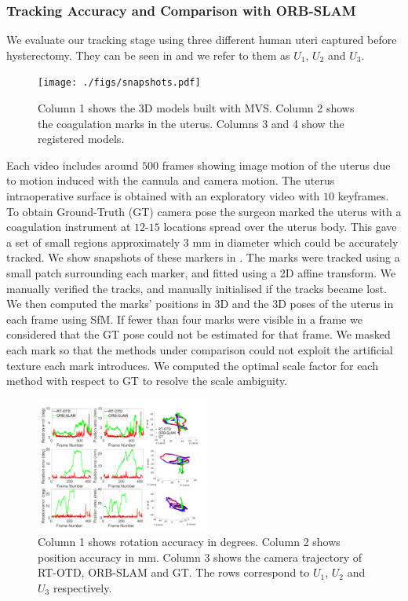 \subsubsection{Tracking Accuracy and Comparison with ORB-SLAM}
We evaluate our tracking stage using three different human uteri captured before hysterectomy. They can be seen in  and we refer to them as $U_1$, $U_2$ and $U_3$.
\begin{figure}[htbp]
  \centering
  \texttt{[image: ./figs/snapshots.pdf]}
\caption{Column 1 shows the 3D models built with MVS. Column 2 shows the coagulation marks in the uterus. Columns 3 and 4 show the registered models.}
\label{fig:hister}
\end{figure}
 Each video includes around $500$ frames showing image motion of the uterus due to motion induced with the cannula and camera motion. The uterus intraoperative surface is obtained with an exploratory video with $10$ keyframes. To obtain Ground-Truth (GT) camera pose the surgeon marked the uterus with a coagulation instrument at $12$-$15$ locations spread over the uterus body. This gave a set of small regions approximately $3$ mm in diameter which could be accurately tracked. We show snapshots of these markers in . The marks were tracked using a small patch surrounding each marker, and fitted using a 2D affine transform. We manually verified the tracks, and manually initialised if the tracks became lost. We then computed the marks’ positions in 3D and the 3D poses of the uterus in each frame using SfM. If fewer than four marks were visible in a frame we considered that the GT pose could not be estimated for that frame. We masked each mark so that the methods under comparison could not exploit the artificial texture each mark introduces. We computed the optimal scale factor for each method with respect to GT to resolve the scale ambiguity.
\begin{figure}[htbp]
  \centering
  \includegraphics[width=0.51\textwidth]{./figs/Accuracy_errors.pdf}
\caption{Column 1 shows rotation accuracy in degrees. Column 2 shows position accuracy in mm. Column 3 shows the camera trajectory of RT-OTD, ORB-SLAM and GT. The rows correspond to $U_1$, $U_2$ and $U_3$ respectively.}
\label{fig:hister_results}
\end{figure}
